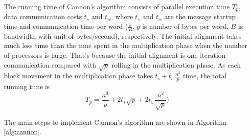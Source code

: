 \documentclass[conference]{IEEEtran}
\begin{document}
The running time of Cannon's algorithm consists of parallel execution time $T_p$, data communication costs $t_s$ and $t_w$, where $t_s$ and $t_w$ are the message startup time and communication time per word ($\frac{y}{B}$, $y$ is number of bytes per word, $B$ is bandwidth with unit of bytes/second), respectively. The initial alignment takes much less time than the time spent in the multiplication phase when the number of  processors is large. That's because the initial alignment is one-iteration communication compared with $\sqrt{p}$ rolling in the multiplication phase. As each block movement in the multiplication phase takes $t_s+t_w\frac{n^2}{p}$ time, the total running time is
\begin{equation}
    T_p = \frac{n^3}{p} + 2t_s\sqrt{p} + 2t_w\frac{n^2}{\sqrt{p}})
\label{eq_cannon_runtime}
\end{equation}

The main steps to implement Cannon's algorithm are shown in Algorithm \ref{alg:cannon}.
\end{document}
